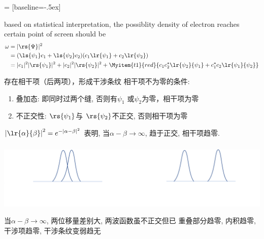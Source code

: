\begin{frame}
     = [baseline=-.5ex]
    \begin{itemize}
        \Item based on statistical interpretation, the possiblity density of electron reaches certain point of screen should be
        \begin{equation*}
        \begin{split}
            \omega &=|\rs{\Psi}|^2 \\
            &= (\ls{\psi_1}c_1 + \ls{\psi_2}c_2 ) (c_1 \lr{\psi_1}+ c_2\lr{\psi_2}) \\
            & = |c_1|^2 |\rs{\psi_1}|^2 + |c_2|^2 |\rs{\psi_2}|^2  
            + \Myitem{t1}{red}{c_1 c_2 ^* \lr{\psi_2}{\psi_1} + c_1 ^* c_2 \lr{\psi_1}{\psi_2} } \\
        \end{split} 
        \end{equation*}
    \end{itemize}
    \begin{itemize}
        \Item 存在相干项（后两项），形成干涉条纹
        \Item 相干项不为零的条件: 
        \begin{enumerate}
            \item 叠加态: 即同时过两个缝, 否则有$\psi_1$ 或$\psi_2$为零，相干项为零
            \item 不正交性: $\rs{\psi_1}$与 $\rs{\psi_2}$不正交, 否则相干项为零
        \end{enumerate}
        \Item $\left|\lr{\alpha}{\beta} \right|^2 = e^{-  \left| \alpha - \beta\right|^2}$ 表明, 当$\alpha - \beta \to \infty $, 
        趋于正交, 相干项趋零.
    \end{itemize}
\end{frame}

\begin{frame}
 \frametitle{}
   \begin{center}
        \includegraphics[width=1.0\textwidth]{figs/11.png}
   \end{center}
 当$\alpha - \beta \to \infty $, 两位移量差别大, 两波函数虽不正交但已
 重叠部分趋零, 内积趋零, 干涉项趋零, 干涉条纹变弱趋无
 
\end{frame}

